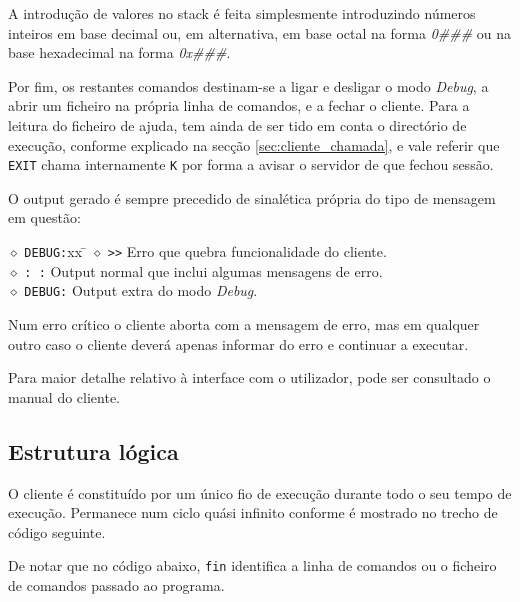	A introdução de valores no stack é feita simplesmente introduzindo números inteiros em base decimal ou, em alternativa, em base octal na forma \emph{0\#\#\#} ou na base hexadecimal na forma \emph{0x\#\#\#}.
	
	Por fim, os restantes comandos destinam-se a ligar e desligar o modo \emph{Debug}, a abrir um ficheiro na própria linha de comandos, e a fechar o cliente.
	Para a leitura do ficheiro de ajuda, tem ainda de ser tido em conta o directório de execução, conforme explicado na secção \ref{sec:cliente_chamada}, e vale referir que \verb|EXIT| chama internamente \verb|K| por forma a avisar o servidor de que fechou sessão.
	
	O output gerado é sempre precedido de sinalética própria do tipo de mensagem em questão:
	
	\begin{tabbing}			%
		$\diamond$ \verb|DEBUG:|xx \= \kill
		$\diamond$ \verb|>>| \> Erro que quebra funcionalidade do cliente.\\
		$\diamond$ \verb|: :| \> Output normal que inclui algumas mensagens de erro.\\
		$\diamond$ \verb|DEBUG:| \> Output extra do modo \emph{Debug}.
	\end{tabbing}

	Num erro crítico o cliente aborta com a mensagem de erro, mas em qualquer outro caso o cliente deverá apenas informar do erro e continuar a executar.
	
	
	Para maior detalhe relativo à interface com o utilizador, pode ser consultado o manual do cliente.
	
	

\subsection{Estrutura lógica\label{sec:cliente_estrutura}}

	\indent\indent O cliente é constituído por um único fio de execução durante todo o seu tempo de execução.
	Permanece num ciclo quási infinito conforme é mostrado no trecho de código seguinte.
	
	De notar que no código abaixo, \verb|fin| identifica a linha de comandos ou o ficheiro de comandos passado ao programa.
	

